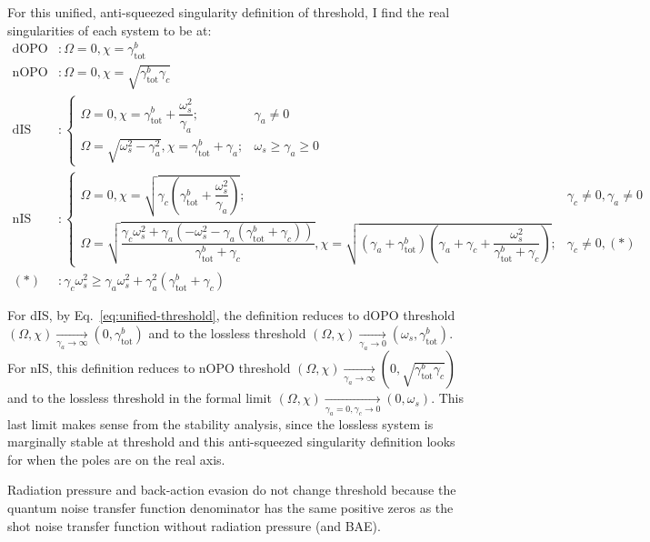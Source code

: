 For this unified, anti-squeezed singularity definition of threshold, I find the real singularities of each system to be at:
\begin{align}
\label{eq:unified-threshold}
\mathrm{dOPO}&: \Omega=0, \chi=\gamma^b_\mathrm{tot}\\
\mathrm{nOPO}&: \Omega=0, \chi=\sqrt{\gamma^b_\mathrm{tot}\gamma_c}\\
\mathrm{dIS}&:\begin{cases}
\Omega=0, \chi=\gamma^b_\mathrm{tot}+\dfrac{\omega_s^2}{\gamma_a};&\gamma_a\neq0\\
\Omega=\sqrt{\omega_s^2-\gamma_a^2}, \chi=\gamma^b_\mathrm{tot}+\gamma_a;&\omega_s\geq\gamma_a\geq0
\end{cases}\\
\mathrm{nIS}&:\begin{cases}
\Omega=0, \chi=\sqrt{\gamma_c(\gamma^b_\mathrm{tot}+\dfrac{\omega_s^2}{\gamma_a})};&\gamma_c\neq0,\gamma_a\neq0\\
\Omega=\sqrt{\dfrac{\gamma_c\omega_s^2+\gamma_a(-\omega_s^2-\gamma_a(\gamma^b_\mathrm{tot}+\gamma_c))}{\gamma^b_\mathrm{tot}+\gamma_c}}, \chi=\sqrt{(\gamma_a+\gamma^b_\mathrm{tot})(\gamma_a+\gamma_c+\dfrac{\omega_s^2}{\gamma^b_\mathrm{tot}+\gamma_c})};&\gamma_c\neq0,(*)
\end{cases}\\
(*)&:\gamma_c\omega_s^2\geq\gamma_a\omega_s^2+\gamma_a^2(\gamma^b_\mathrm{tot}+\gamma_c)
\end{align}

For dIS, by Eq.~\ref{eq:unified-threshold}, the definition reduces to dOPO threshold $(\Omega,\chi)\xrightarrow[\gamma_a\rightarrow\infty]{}(0,\gamma^b_\mathrm{tot})$ and to the lossless threshold $(\Omega,\chi)\xrightarrow[\gamma_a\rightarrow0]{}(\omega_s,\gamma^b_\mathrm{tot})$.
For nIS, this definition reduces to nOPO threshold $(\Omega,\chi)\xrightarrow[\gamma_a\rightarrow\infty]{}(0,\sqrt{\gamma^b_\mathrm{tot}\gamma_c})$ and to the lossless threshold in the formal limit $(\Omega,\chi)\xrightarrow[\gamma_a=0,\gamma_c\rightarrow0]{}(0,\omega_s)$. This last limit makes sense from the stability  analysis, since the lossless system is marginally stable at threshold and this anti-squeezed singularity definition looks for when the poles are on the real axis.

Radiation pressure and back-action evasion do not change threshold because the quantum noise transfer function denominator has the same positive zeros as the shot noise transfer function without radiation pressure (and BAE).

